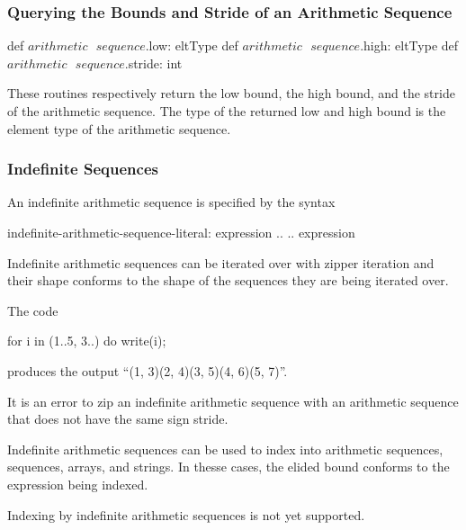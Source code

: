\subsubsection{Querying the Bounds and Stride of an Arithmetic Sequence}

\begin{protohead}
def $arithmetic\mbox{ }sequence$.low: eltType
def $arithmetic\mbox{ }sequence$.high: eltType
def $arithmetic\mbox{ }sequence$.stride: int
\end{protohead}
\begin{protobody}
These routines respectively return the low bound, the high bound, and
the stride of the arithmetic sequence.  The type of the returned low
and high bound is the element type of the arithmetic sequence.
\end{protobody}

\subsubsection{Indefinite Sequences}
\label{Indefinite_Sequences}

An indefinite arithmetic sequence is specified by the syntax
\begin{syntax}
indefinite-arithmetic-sequence-literal:
  expression ..
  .. expression
\end{syntax}

Indefinite arithmetic sequences can be iterated over with zipper
iteration and their shape conforms to the shape of the sequences they
are being iterated over.
\begin{example}
The code
\begin{chapel}
for i in (1..5, 3..) do
  write(i);
\end{chapel}
produces the output ``(1, 3)(2, 4)(3, 5)(4, 6)(5, 7)''.
\end{example}

It is an error to zip an indefinite arithmetic sequence with an
arithmetic sequence that does not have the same sign stride.

Indefinite arithmetic sequences can be used to index into arithmetic
sequences, sequences, arrays, and strings.  In thesse cases, the
elided bound conforms to the expression being indexed.
\begin{status}
Indexing by indefinite arithmetic sequences is not yet supported.
\end{status}
